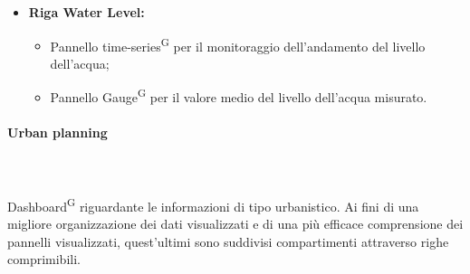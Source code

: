 \documentclass[8pt]{article}
\newcommand{\glossterm}[1]{#1\textsuperscript{G}} %
\newcommand{\subsubsubsection}[1]{\paragraph{#1}\mbox{}\\\\}
\begin{document}
\begin{itemize}
\begin{itemize}
        \item Pannello \glossterm{time-series} per il monitoraggio dell'andamento della quantità di PM2.5 nell'aria;
        \item Pannello \glossterm{time-series} per il monitoraggio dell'andamento della quantità di PM10 nell'aria;
        \item Pannello \glossterm{time-series} per il monitoraggio dell'andamento della quantità di O3 nell'aria;
        \item Pannello \glossterm{time-series} per il monitoraggio dell'andamento della quantità di NO2 nell'aria;
        \item Pannello \glossterm{Gauge} per il valore medio di PM2.5 misurato;
        \item Pannello \glossterm{Gauge} per il valore medio di PM10 misurato;
        \item Pannello \glossterm{Gauge} per il valore medio di O3 misurato;
        \item Pannello \glossterm{Gauge} per il valore medio di NO2 misurato.
    \end{itemize}
    \item \textbf{Riga Water Level:}
    \begin{itemize}
	\setlength\itemsep{0em}
        \item Pannello \glossterm{time-series} per il monitoraggio dell'andamento del livello dell'acqua;
        \item Pannello \glossterm{Gauge} per il valore medio del livello dell'acqua misurato. 
    \end{itemize}
\end{itemize}
\subsubsubsection{Urban planning} 
\glossterm{Dashboard} riguardante le informazioni di tipo urbanistico.
Ai fini di una migliore organizzazione dei dati visualizzati e di una più efficace comprensione dei pannelli visualizzati, quest'ultimi sono suddivisi compartimenti attraverso righe comprimibili.
\end{document}
